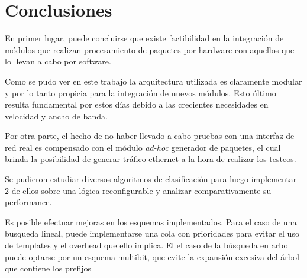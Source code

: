 \chapter{Conclusiones}

En primer lugar, puede concluirse que existe factibilidad en la integración de módulos que realizan procesamiento de paquetes por hardware con aquellos que lo llevan a cabo por software.

Como se pudo ver en este trabajo la arquitectura utilizada es claramente modular y por lo tanto propicia para la integración de nuevos módulos. Esto último resulta fundamental por estos días debido a las crecientes necesidades en velocidad y ancho de banda.

Por otra parte, el hecho de no haber llevado a cabo pruebas con una interfaz de red real es compensado con el módulo \textit{ad-hoc} generador de paquetes, el cual brinda la posibilidad de generar tráfico ethernet a la hora de realizar los testeos.

Se pudieron estudiar diversos algoritmos de clasificación para luego implementar 2 de ellos sobre una lógica reconfigurable y analizar comparativamente su performance.

Es posible efectuar mejoras en los esquemas implementados. Para el caso de una busqueda lineal, puede implementarse una cola con prioridades para evitar el uso de templates y el overhead que ello implica. El el caso de la búsqueda en arbol puede optarse por un esquema multibit, que evite la expansión excesiva del árbol que contiene los prefijos 



